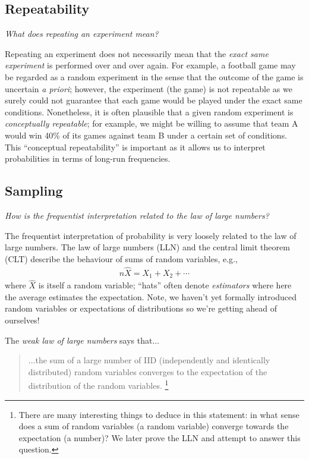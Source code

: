 \subsection{Repeatability}

\emph{What does repeating an experiment mean?}

Repeating an experiment does not necessarily mean 
that the \emph{exact same experiment} is performed over and over
again. 
For example, 
a football game may be regarded as a random experiment in 
the sense that the outcome of the game is uncertain \emph{a priori}; 
however, 
the experiment (the game) is not repeatable as
we surely could not guarantee that each game would be played
under the exact same conditions. 
Nonetheless, 
it is often plausible that a given random experiment 
is \emph{conceptually repeatable}; 
for example,
we might be willing to assume that team A would win 40\% of
its games against team B under a certain set of conditions. 
This ``conceptual repeatability'' is important as it allows us to interpret
probabilities in terms of long-run frequencies.

\subsection{Sampling}

\emph{How is the frequentist interpretation related to the law of large numbers?}

The frequentist interpretation of probability is very loosely related to the law of large numbers.
The law of large numbers (LLN)
and the central limit theorem (CLT) describe the behaviour of sums of random variables, e.g.,
\begin{align}
n\widehat{X} = X_{1} + X_{2} + \cdots
\end{align}
where \(\widehat{X}\) is itself a random variable; 
``hats'' often denote \emph{estimators} where here the average estimates the expectation. 
Note, we haven't yet formally introduced random variables or 
expectations of distributions so we're getting ahead of ourselves!

The \emph{weak law of large numbers} says that...

\begin{quote}
...the sum of a large number of IID
(independently and identically distributed) random variables
converges to the expectation of the distribution
of the random variables.%
\footnote{
There are many interesting things to deduce in this statement: 
in what sense does a sum of random variables (a random variable) converge
towards the expectation (a number)?
We later prove the LLN and attempt to answer this question. 
}
\end{quote}

